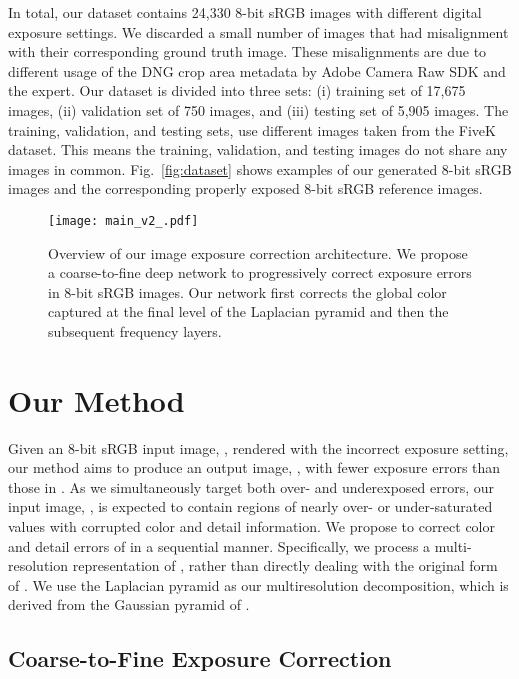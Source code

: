 \documentclass[final]{cvpr}
\begin{document}
In total, our dataset contains 24,330 8-bit sRGB images with different digital exposure settings. We discarded a small number of images that had misalignment with their corresponding ground truth image. These misalignments are due to different usage of the DNG crop area metadata by Adobe Camera Raw SDK and the expert. Our dataset is divided into three sets: (i) training set of 17,675 images, (ii) validation set of 750 images, and (iii) testing set of 5,905 images.   The training, validation, and testing sets, use different images taken from the FiveK dataset. This means the training, validation, and testing images do not share any images in common. Fig.\ \ref{fig:dataset} shows examples of our generated 8-bit sRGB images and the corresponding properly exposed 8-bit sRGB reference images.

\begin{figure*}[t]
\centering
\texttt{[image: main\_v2\_.pdf]}
\vspace{-6mm}
\caption{Overview of our image exposure correction architecture. We propose a coarse-to-fine deep network to progressively correct exposure errors in 8-bit sRGB images.
Our network first corrects the global color captured at the final level of the Laplacian pyramid and then the subsequent frequency layers.\vspace{-4mm}}
\label{fig:main}
\end{figure*}

\section{Our Method} \label{sec:method}
Given an 8-bit sRGB input image, , rendered with the incorrect exposure setting, our method aims to produce an output image, , with fewer exposure errors than those in . As we simultaneously target both over- and underexposed errors, our input image, , is expected to contain regions of nearly over- or under-saturated values with corrupted color and detail information.
We propose to correct color and detail errors of  in a sequential manner. Specifically, we process a multi-resolution representation of , rather than directly dealing with the original form of . We use the Laplacian pyramid \cite{burt1983laplacian} as our multiresolution decomposition, which is derived  from the Gaussian pyramid of .

\subsection{Coarse-to-Fine Exposure Correction}
\end{document}
